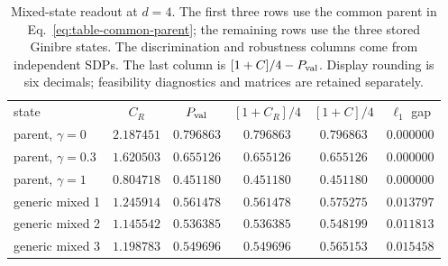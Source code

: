 \begin{table}[!htbp]
\centering
\begin{ruledtabular}
\begin{tabular}{lccccc}
state & $C_R$ & $P_{\rm val}$ & $[1+C_R]/4$ & $[1+C]/4$ & $\ell_1$ gap\\
\colrule
parent, $\gamma=0$ & $2.187451$ & $0.796863$ & $0.796863$ & $0.796863$ & $0.000000$\\
parent, $\gamma=0.3$ & $1.620503$ & $0.655126$ & $0.655126$ & $0.655126$ & $0.000000$\\
parent, $\gamma=1$ & $0.804718$ & $0.451180$ & $0.451180$ & $0.451180$ & $0.000000$\\
generic mixed 1 & $1.245914$ & $0.561478$ & $0.561478$ & $0.575275$ & $0.013797$\\
generic mixed 2 & $1.145542$ & $0.536385$ & $0.536385$ & $0.548199$ & $0.011813$\\
generic mixed 3 & $1.198783$ & $0.549696$ & $0.549696$ & $0.565153$ & $0.015458$\\
\end{tabular}
\end{ruledtabular}
\caption{Mixed-state readout at $d=4$. The first three rows use the common parent in Eq.~\eqref{eq:table-common-parent}; the remaining rows use the three stored Ginibre states. The discrimination and robustness columns come from independent SDPs. The last column is $[1+C]/4-P_{\rm val}$. Display rounding is six decimals; feasibility diagnostics and matrices are retained separately.}
\label{tab:sdp}
\end{table}
